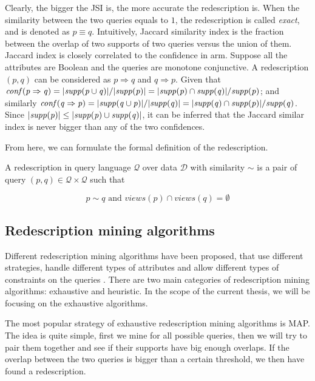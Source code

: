 Clearly, the bigger the \acl{JSI} is, the more accurate the redescription is.
When the similarity between the two queries equals to $1$, the redescription is called \textit{exact}, and is denoted as $p \equiv q$.
Intuitively, Jaccard similarity index is the fraction between the overlap of two supports of two queries versus the union of them.
Jaccard index is closely correlated to the confidence in \acl{arm}.
Suppose all the attributes are Boolean and the queries are monotone conjunctive.
A redescription $\left(p,q\right)$ can be considered as $p \Rightarrow q$ and $q \Rightarrow p$.
Given that $\mathit{conf({p} \Rightarrow {q})}=\lvert \mathit{supp({p \cup q})} \rvert/\lvert \mathit{supp({p})} \rvert=\lvert \mathit{supp({p})} \cap \mathit{supp({q})}\rvert/\mathit{supp({p})}$;
and similarly $\mathit{conf({q} \Rightarrow {p})}=\lvert \mathit{supp({q \cup p})} \rvert/\lvert \mathit{supp({q})} \rvert=\lvert \mathit{supp({q})} \cap \mathit{supp({p})}\rvert/\mathit{supp({q})}$.
Since $\lvert \mathit{supp({p})} \rvert\leq \lvert\mathit{supp({p})}\cup \mathit{supp({q})}\rvert$, it can be inferred that the Jaccard similar index is never bigger than any of the two confidences.

From here, we can formulate the formal definition of the redescription.

\begin{definition}
    A redescription in query language $\mathcal{Q}$ over data $\mathcal{D}$ with similarity $\sim$ is a pair of query $(p, q) \in \mathcal{Q} \times \mathcal{Q}$ such that

    \begin{equation}
        p \sim q \text{ and } views(p) \cap views(q) = \emptyset
    \end{equation}
\end{definition}

\subsection{Redescription mining algorithms}
Different redescription mining algorithms have been proposed, that use different strategies, handle different types of attributes and allow different types of constraints on the queries \cite{galbrun2018redescription}.
There are two main categories of redescription mining algorithms: exhaustive and heuristic.
In the scope of the current thesis, we will be focusing on the exhaustive algorithms.

The most popular strategy of exhaustive redescription mining algorithms is \ac{MAP}.
The idea is quite simple, first we mine for all possible queries, then we will try to pair them together and see if their supports have big enough overlaps.
If the overlap between the two queries is bigger than a certain threshold, we then have found a redescription.

